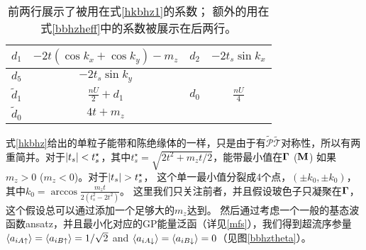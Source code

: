 



\begin{table}[htb]
    \centering\small
	\caption{\label{paramtabBHZ}前两行展示了被用在式\eqref{hkbhz1}的系数；
	额外的用在式\eqref{bbhzheff}中的系数被展示在后两行。}
	\begin{tabular}{cc|cc}
	\hline
		$d_1$ & $-2t(\cos k_x +\cos k_y)-m_z$ & $d_{2}$ & $-2t_s\sin k_x$ \\
		\hline
		$d_{5}$ & $-2t_s \sin k_y$ & \\
		\hline
		$\tilde d_1$ & $\frac{nU}{2}+d_1$ & $d_0$ & $\frac{nU}{4}$ \\
		\hline
		$\tilde d_0$ & $4t+m_z$ &  & \\
		\hline
	\end{tabular}
\end{table}

式\eqref{hkbhz}给出的单粒子能带和陈绝缘体的一样，只是由于有$\tilde{\mathcal P}\tilde{\mathcal T}$对称性，所以有两重简并。对于$\abs{t_s}<t_s^\star$，其中$t_s^\star=\sqrt{2t^2+m_z t/2}$，能带最小值在$\vb \Gamma$ ($\vb M$) 如果 $m_z>0$ ($m_z<0$)。对于$\abs{t_s}>t_s^\star$，
这个单一最小值分裂成4个点，$(\pm k_0,\pm k_0)$，其中$k_0=\arccos\frac{m_z t}{2(t_s^2 -2t^2)}$。
这里我们只关注前者，并且假设玻色子只凝聚在$\vb \Gamma$，
这个假设总可以通过添加一个足够大的$m_z$达到。
然后通过考虑一个一般的基态波函数ansatz，并且最小化对应的GP能量泛函（详见\ref{mfs}），我们得到超流序参量$\expval{a_{iA\uparrow}}=\expval{a_{iB\uparrow}}=1/\sqrt{2}$ and $\expval{a_{iA\downarrow}}=\expval{a_{iB\downarrow}}=0$（见图\ref{bbhztheta}）。

